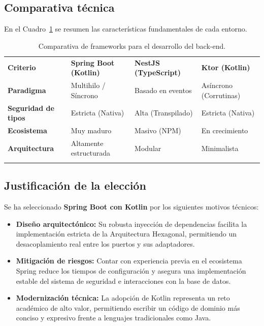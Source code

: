 \subsection*{Comparativa técnica}

En el Cuadro~\ref{tab:comparativa-backend} se resumen las características fundamentales de cada entorno.

\begin{table}[H]
    \renewcommand{\arraystretch}{1.25}
    \begin{tabularx}{\textwidth}{>{\RaggedRight\arraybackslash}p{1.9cm} >{\RaggedRight\arraybackslash}X >{\RaggedRight\arraybackslash}X >{\RaggedRight\arraybackslash}X}
        \textbf{Criterio} & \textbf{Spring Boot (Kotlin)} & \textbf{NestJS (TypeScript)} & \textbf{Ktor (Kotlin)} \\ \lightrule
        \textbf{Paradigma} & Multihilo / Síncrono & Basado en eventos & Asíncrono (Corrutinas) \\ \lightrule
        \textbf{Seguridad de tipos} & Estricta (Nativa) & Alta (Transpilado) & Estricta (Nativa) \\ \lightrule
        \textbf{Ecosistema} & Muy maduro & Masivo (NPM) & En crecimiento \\ \lightrule
        \textbf{Arquitectura} & Altamente estructurada & Modular & Minimalista \\ \lightrule
    \end{tabularx}
    \caption{Comparativa de frameworks para el desarrollo del back-end.}
    \label{tab:comparativa-backend}
\end{table}

\subsection*{Justificación de la elección}

Se ha seleccionado \textbf{Spring Boot con Kotlin} por los siguientes motivos técnicos:
\begin{itemize}
    \item \textbf{Diseño arquitectónico:} Su robusta inyección de dependencias facilita la implementación estricta de la Arquitectura Hexagonal, permitiendo un desacoplamiento real entre los puertos y sus adaptadores.
    \item \textbf{Mitigación de riesgos:} Contar con experiencia previa en el ecosistema Spring reduce los tiempos de configuración y asegura una implementación estable del sistema de seguridad e interacciones con la base de datos.
    \item \textbf{Modernización técnica:} La adopción de Kotlin representa un reto académico de alto valor, permitiendo escribir un código de dominio más conciso y expresivo frente a lenguajes tradicionales como Java.
\end{itemize}

